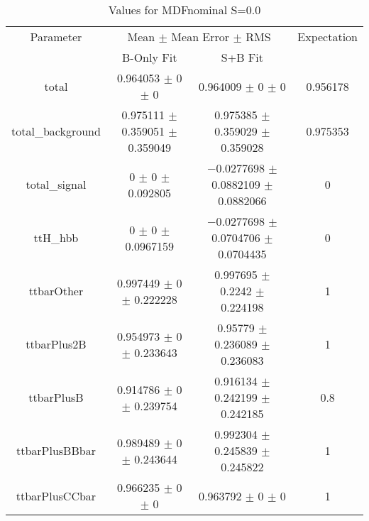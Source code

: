 \begin{table}
\centering
\caption{Values for MDFnominal S=0.0}
\begin{tabular}{cccc}
\toprule
Parameter & \multicolumn{2}{c}{Mean $\pm$ Mean Error $\pm$ RMS} & Expectation\\
 & B-Only Fit & S+B Fit & \\
\midrule
total & \num{0.964053} $\pm$ \num{0} $\pm$ \num{0} & \num{0.964009} $\pm$ \num{0} $\pm$ \num{0} & \num{0.956178}\\
total\_background & \num{0.975111} $\pm$ \num{0.359051} $\pm$ \num{0.359049} & \num{0.975385} $\pm$ \num{0.359029} $\pm$ \num{0.359028} & \num{0.975353}\\
total\_signal & \num{0} $\pm$ \num{0} $\pm$ \num{0.092805} & \num{-0.0277698} $\pm$ \num{0.0882109} $\pm$ \num{0.0882066} & \num{0}\\
ttH\_hbb & \num{0} $\pm$ \num{0} $\pm$ \num{0.0967159} & \num{-0.0277698} $\pm$ \num{0.0704706} $\pm$ \num{0.0704435} & \num{0}\\
ttbarOther & \num{0.997449} $\pm$ \num{0} $\pm$ \num{0.222228} & \num{0.997695} $\pm$ \num{0.2242} $\pm$ \num{0.224198} & \num{1}\\
ttbarPlus2B & \num{0.954973} $\pm$ \num{0} $\pm$ \num{0.233643} & \num{0.95779} $\pm$ \num{0.236089} $\pm$ \num{0.236083} & \num{1}\\
ttbarPlusB & \num{0.914786} $\pm$ \num{0} $\pm$ \num{0.239754} & \num{0.916134} $\pm$ \num{0.242199} $\pm$ \num{0.242185} & \num{0.8}\\
ttbarPlusBBbar & \num{0.989489} $\pm$ \num{0} $\pm$ \num{0.243644} & \num{0.992304} $\pm$ \num{0.245839} $\pm$ \num{0.245822} & \num{1}\\
ttbarPlusCCbar & \num{0.966235} $\pm$ \num{0} $\pm$ \num{0} & \num{0.963792} $\pm$ \num{0} $\pm$ \num{0} & \num{1}\\
\bottomrule
\end{tabular}
\end{table}